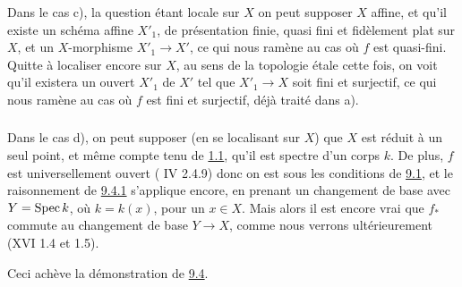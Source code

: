 \documentclass[10pt]{../fichiers-configuration-latex/smfart}
\begin{document}
Dans le cas c), la question étant locale sur $X$ on peut supposer $X$
affine, et qu'il existe un schéma affine $X'_{1}$, de présentation
finie, quasi fini et fidèlement plat sur $X$, et un $X$-morphisme
$X'_{1}\rightarrow X'$, ce qui nous ramène au cas où $f$ est
quasi-fini. Quitte à localiser encore sur $X$, au sens de la topologie
étale cette fois, on voit qu'il existera un ouvert $X'_{1}$ de $X'$
tel que $X'_{1}\rightarrow X$ soit fini et surjectif, ce qui nous
ramène au cas où $f$ est fini et surjectif, déjà traité dans a).

\subsubsection{}
Dans le cas d), on peut supposer (en se localisant sur $X$) que $X$
est réduit à un seul point, et même compte tenu de \hyperref[VIII.thm1.1]{1.1}, qu'il est
spectre d'un corps $k$. De plus, $f$ est universellement ouvert (\EGA
IV 2.4.9) donc on est sous les conditions de \hyperref[VIII.prop9.1]{9.1}, et le raisonnement
de \hyperref[VIII.subsubsec9.4.1]{9.4.1} s'applique encore, en prenant un changement de base avec
$Y=\operatorname{Spec} k$, où $k=k(x)$, pour un $x\in X$. Mais alors il est encore
vrai que $f_{\ast}$ commute au changement de base $Y\rightarrow X$,
comme nous verrons ultérieurement (XVI 1.4 et 1.5).

Ceci achève la démonstration de \hyperref[VIII.thm9.4]{9.4}.


\ifx\danslelivre\undefined
\end{document}
